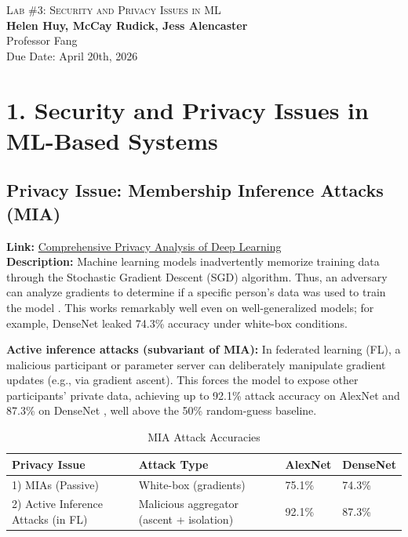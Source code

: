 \documentclass[letterpaper]{article}
\newcommand{\labTitle}{Lab \#3: Security and Privacy Issues in ML}
\newcommand{\labDueDate}{April 20th, 2026}
\newcommand{\labClassTime}{}
\newcommand{\labClassInstructor}{Professor Fang}
\newcommand{\labAuthorName}{\textbf{Helen Huy, McCay Rudick, Jess Alencaster}}
\begin{document}
\thispagestyle{empty}


\vspace*{\fill}
\begin{center}
    {\Huge \scshape \labTitle} \\ \vspace{10pt}
    {\Large \labAuthorName} \\ \vspace{5pt}
    {\large \labClassInstructor \ \labClassTime} \\ \vspace{5pt}
    {\large Due Date: \labDueDate}
\end{center} 
\vspace*{\fill}

\newpage

\section{1. Security and Privacy Issues in ML-Based Systems}

\subsection*{Privacy Issue: Membership Inference Attacks (MIA)}
\textbf{Link:} \href{https://ieeexplore.ieee.org/abstract/document/8835245}{Comprehensive Privacy Analysis of Deep Learning \cite{nasr2019}} \\
\textbf{Description:} Machine learning models inadvertently memorize training data through the Stochastic Gradient Descent (SGD) algorithm. Thus, an adversary can analyze gradients to determine if a specific person's data was used to train the model \cite{nasr2019}. This works remarkably well even on well-generalized models; for example, DenseNet leaked 74.3\% accuracy under white-box conditions.

\textbf{Active inference attacks (subvariant of MIA):} In federated learning (FL), a malicious participant or parameter server can deliberately manipulate gradient updates (e.g., via gradient ascent). This forces the model to expose other participants' private data, achieving up to 92.1\% attack accuracy on AlexNet and 87.3\% on DenseNet \cite{nasr2019}, well above the 50\% random-guess baseline.

\begin{table}[h!]
\centering
\begin{tabular}{|l|l|l|l|}
\hline
\textbf{Privacy Issue} & \textbf{Attack Type} & \textbf{AlexNet} & \textbf{DenseNet} \\ \hline
1) MIAs (Passive) & White-box (gradients) & 75.1\% & 74.3\% \\ \hline
2) Active Inference Attacks (in FL) & Malicious aggregator (ascent + isolation) & 92.1\% & 87.3\% \\ \hline
\end{tabular}
\caption{MIA Attack Accuracies \cite{nasr2019}}
\end{table}
\end{document}
